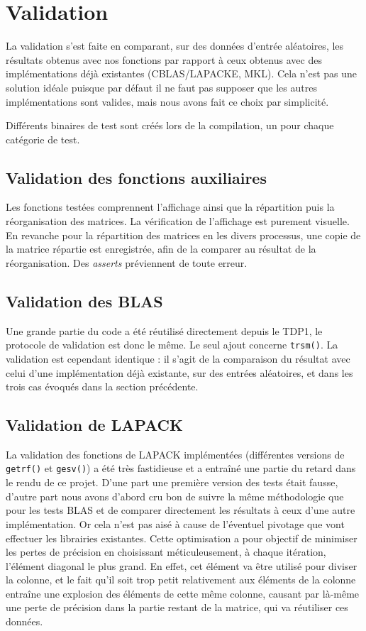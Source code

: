 \section{Validation}

La validation s'est faite en comparant, sur des données d'entrée aléatoires, les résultats obtenus avec nos fonctions par rapport à ceux obtenus avec des implémentations déjà existantes (\textsf{CBLAS}/\textsf{LAPACKE}, \textsf{MKL}). Cela n'est pas une solution idéale puisque par défaut il ne faut pas supposer que les autres implémentations sont valides, mais nous avons fait ce choix par simplicité.

Différents binaires de test sont créés lors de la compilation, un pour chaque catégorie de test.

\subsection{Validation des fonctions auxiliaires}

Les fonctions testées comprennent l'affichage ainsi que la répartition puis la réorganisation des matrices. La vérification de l'affichage est purement visuelle. En revanche pour la répartition des matrices en les divers processus, une copie de la matrice répartie est enregistrée, afin de la comparer au résultat de la réorganisation. Des \emph{asserts} préviennent de toute erreur.

\subsection{Validation des BLAS}

Une grande partie du code a été réutilisé directement depuis le TDP1, le protocole de validation est donc le même. Le seul ajout concerne \texttt{trsm()}. La validation est cependant identique : il s'agit de la comparaison du résultat avec celui d'une implémentation déjà existante, sur des entrées aléatoires, et dans les trois cas évoqués dans la section précédente.

\subsection{Validation de LAPACK}

La validation des fonctions de LAPACK implémentées (différentes versions de \texttt{getrf()} et \texttt{gesv()}) a été très fastidieuse et a entraîné une partie du retard dans le rendu de ce projet. D'une part une première version des tests était fausse, d'autre part nous avons d'abord cru bon de suivre la même méthodologie que pour les tests BLAS et de comparer directement les résultats à ceux d'une autre implémentation. Or cela n'est pas aisé à cause de l'éventuel pivotage que vont effectuer les librairies existantes. Cette optimisation a pour objectif de minimiser les pertes de précision en choisissant méticuleusement, à chaque itération, l'élément diagonal le plus grand. En effet, cet élément va être utilisé pour diviser la colonne, et le fait qu'il soit trop petit relativement aux éléments de la colonne entraîne une explosion des éléments de cette même colonne, causant par là-même une perte de précision dans la partie restant de la matrice, qui va réutiliser ces données.

